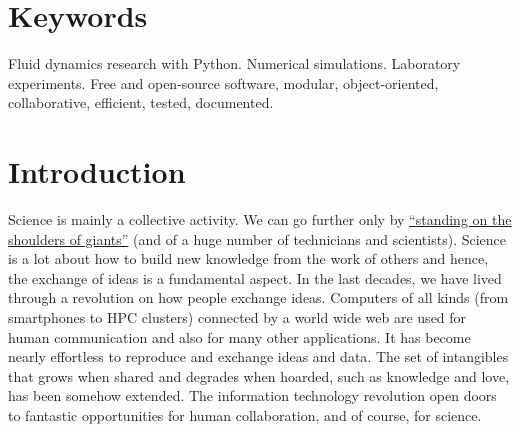 \documentclass{../jors}
\begin{document}
\section*{Keywords}


Fluid dynamics research with Python. Numerical simulations. Laboratory
experiments. Free and open-source software, modular, object-oriented,
collaborative, efficient, tested, documented.

\section*{Introduction}



Science is mainly a collective activity.  We can go further only by
\href{https://en.wikipedia.org/wiki/%
Standing_on_the_shoulders_of_giants}{``standing on the shoulders of giants''}
(and of a huge number of technicians and scientists).  Science is a lot about
how to build new knowledge from the work of others and hence, the exchange
of ideas is a fundamental aspect.
%
In the last decades, we have lived through a revolution on how people exchange
ideas.
%
Computers of all kinds (from smartphones to HPC clusters) connected by a world
wide web are used for human communication and also for many other applications.
%
It has become nearly effortless to reproduce and exchange ideas and data.
%
The set of intangibles that grows when shared and degrades when hoarded, such as
knowledge and love, has been somehow extended.
%
The information technology revolution open doors to fantastic opportunities for
human collaboration, and of course, for science.
\end{document}
